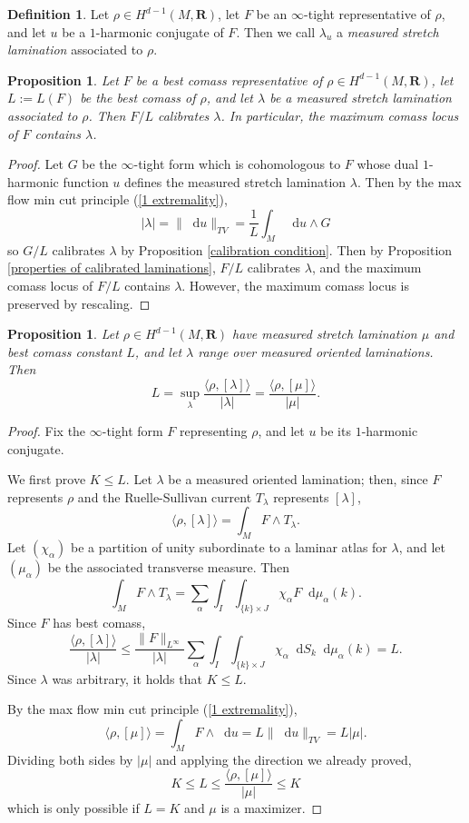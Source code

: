 \documentclass[reqno,11pt]{amsart}
\newcommand{\RR}{\mathbf{R}}
\newcommand*\dif{\mathop{}\!\mathrm{d}}
\newcommand{\dfn}[1]{\emph{#1}\index{#1}}
\newtheorem{proposition}[theorem]{Proposition}
\theoremstyle{definition}
\newtheorem{definition}[theorem]{Definition}
\numberwithin{equation}{section}
\begin{document}
\begin{definition}
Let $\rho \in H^{d - 1}(M, \RR)$, let $F$ be an $\infty$-tight representative of $\rho$, and let $u$ be a $1$-harmonic conjugate of $F$.
Then we call $\lambda_u$ a \dfn{measured stretch lamination} associated to $\rho$.
\end{definition}

\begin{proposition}\label{MCL contains Thurston}
Let $F$ be a best comass representative of $\rho \in H^{d - 1}(M, \RR)$, let $L := L(F)$ be the best comass of $\rho$, and let $\lambda$ be a measured stretch lamination associated to $\rho$.
Then $F/L$ calibrates $\lambda$. In particular, the maximum comass locus of $F$ contains $\lambda$.
\end{proposition}
\begin{proof}
Let $G$ be the $\infty$-tight form which is cohomologous to $F$ whose dual $1$-harmonic function $u$ defines the measured stretch lamination $\lambda$.
Then by the max flow min cut principle (\ref{1 extremality}), 
$$|\lambda| = \|\dif u\|_{TV} = \frac{1}{L} \int_M \dif u \wedge G$$
so $G/L$ calibrates $\lambda$ by Proposition \ref{calibration condition}.
Then by Proposition \ref{properties of calibrated laminations}, $F/L$ calibrates $\lambda$, and the maximum comass locus of $F/L$ contains $\lambda$.
However, the maximum comass locus is preserved by rescaling.
\end{proof}

\begin{proposition}\label{L equals K}
	Let $\rho \in H^{d - 1}(M, \RR)$ have measured stretch lamination $\mu$ and best comass constant $L$, and let $\lambda$ range over measured oriented laminations. Then 
	$$L = \sup_\lambda \frac{\langle \rho, [\lambda]\rangle}{|\lambda|} = \frac{\langle \rho, [\mu]\rangle}{|\mu|}.$$
\end{proposition}
\begin{proof}
Fix the $\infty$-tight form $F$ representing $\rho$, and let $u$ be its $1$-harmonic conjugate.

We first prove $K \leq L$.
Let $\lambda$ be a measured oriented lamination; then, since $F$ represents $\rho$ and the Ruelle-Sullivan current $T_\lambda$ represents $[\lambda]$,
$$\langle \rho, [\lambda]\rangle = \int_M F \wedge T_\lambda.$$
Let $(\chi_\alpha)$ be a partition of unity subordinate to a laminar atlas for $\lambda$, and let $(\mu_\alpha)$ be the associated transverse measure. Then 
$$\int_M F \wedge T_\lambda = \sum_\alpha \int_I \int_{\{k\} \times J} \chi_\alpha F \dif \mu_\alpha(k).$$
Since $F$ has best comass,
$$\frac{\langle \rho, [\lambda] \rangle}{|\lambda|}
\leq \frac{\|F\|_{L^\infty}}{|\lambda|} \sum_\alpha \int_I \int_{\{k\} \times J} \chi_\alpha \dif S_k \dif \mu_\alpha(k) = L.$$
Since $\lambda$ was arbitrary, it holds that $K \leq L$.

By the max flow min cut principle (\ref{1 extremality}),
$$\langle \rho, [\mu]\rangle = \int_M F \wedge \dif u = L \|\dif u\|_{TV} = L|\mu|.$$
Dividing both sides by $|\mu|$ and applying the direction we already proved,
$$K \leq L \leq \frac{\langle \rho, [\mu]\rangle}{|\mu|} \leq K$$
which is only possible if $L = K$ and $\mu$ is a maximizer.
\end{proof}
\end{document}

